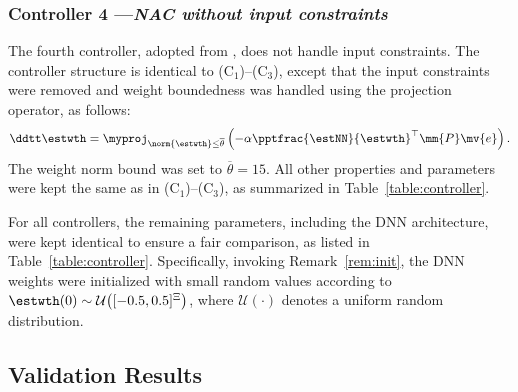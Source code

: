 \documentclass[letterpaper, journal, twoside]{IEEEtran}
\begin{document}
\subsubsection*{Controller 4 —\textit{NAC without input constraints}}

The fourth controller, adopted from \cite{Patil:2022aa}, does not handle input constraints.
The controller structure is identical to (C$_1$)--(C$_3$), except that the input constraints were removed and weight boundedness was handled using the projection operator, as follows:
\begin{equation}
    \ddtt\estwth
    =
    \myproj_{\norm{\estwth}\le\overline{\theta}}
    \left(
        -\alpha
        \pptfrac{\estNN}{\estwth}^\top
        \mm{P}
        \mv{e}
    \right)
    .
\end{equation}
The weight norm bound was set to $\overline{\theta}=15$.
All other properties and parameters were kept the same as in (C$_1$)--(C$_3$), as summarized in Table~\ref{table:controller}.

\hfill

For all controllers, the remaining parameters, including the DNN architecture, were kept identical to ensure a fair comparison, as listed in Table~\ref{table:controller}.
Specifically, invoking Remark~\ref{rem:init}, the DNN weights were initialized with small random values according to $\estwth(0)\sim\mathcal{U}\bigl([-0.5,0.5]^{\Xi}\bigr)$, where $\mathcal{U}(\cdot)$ denotes a uniform random distribution.

\subsection{Validation Results} \label{sec:val:results}
\end{document}
